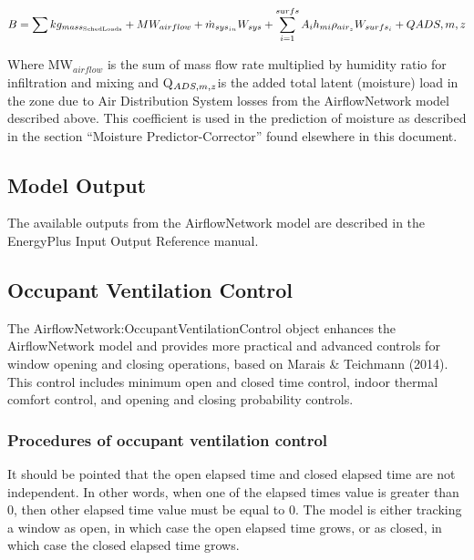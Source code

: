 \begin{equation}
B = \sum {k{g_{mas{s_{{\rm{Sched Loads}}}}}}}  + M{W_{airflow}} + {\dot m_{sy{s_{in}}}}{W_{sys}} + \sum\limits_{i = 1}^{surfs} {{A_i}{h_{mi}}{\rho_{ai{r_z}}}{W_{surf{s_i}}}}  + QADS,m,z
\end{equation}

Where MW\(_{airflow}\) is the sum of mass flow rate multiplied by humidity ratio for infiltration and mixing and Q\(_{ADS,m,z\\}\)is the added total latent (moisture) load in the zone due to Air Distribution System losses from the AirflowNetwork model described above. This coefficient is used in the prediction of moisture as described in the section ``Moisture Predictor-Corrector'' found elsewhere in this document.

\subsection{Model Output}\label{model-output}

The available outputs from the AirflowNetwork model are described in the EnergyPlus Input Output Reference manual.

\subsection{Occupant Ventilation Control}\label{occupant-ventilation-control}

The AirflowNetwork:OccupantVentilationControl object enhances the AirflowNetwork model and provides more practical and advanced controls for window opening and closing operations, based on Marais \& Teichmann (2014). This control includes minimum open and closed time control, indoor thermal comfort control, and opening and closing probability controls.

\subsubsection{Procedures of occupant ventilation control}\label{procedures-of-occupant-ventilation-control}

It should be pointed that the open elapsed time and closed elapsed time are not independent. In other words, when one of the elapsed times value is greater than 0, then other elapsed time value must be equal to 0. The model is either tracking a window as open, in which case the open elapsed time grows, or as closed, in which case the closed elapsed time grows.

